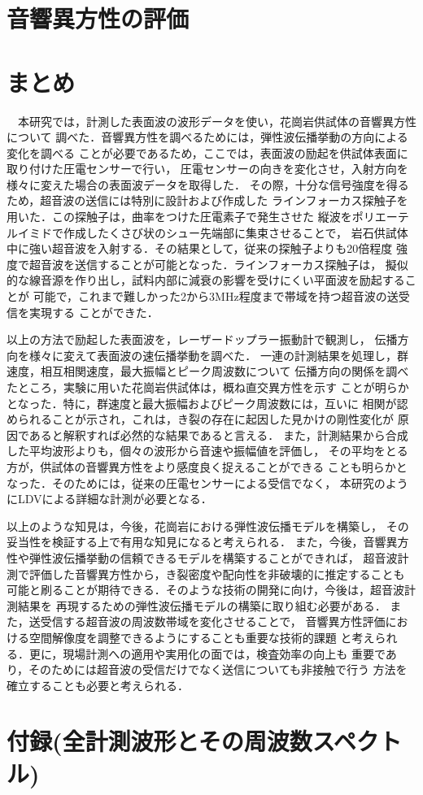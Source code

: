 ﻿\documentclass[11pt,a4j]{jarticle}
\begin{document}
\section{音響異方性の評価}

\newpage
\section{まとめ}
　本研究では，計測した表面波の波形データを使い，花崗岩供試体の音響異方性について
調べた．音響異方性を調べるためには，弾性波伝播挙動の方向による変化を調べる
ことが必要であるため，ここでは，表面波の励起を供試体表面に取り付けた圧電センサーで行い，
圧電センサーの向きを変化させ，入射方向を様々に変えた場合の表面波データを取得した．
その際，十分な信号強度を得るため，超音波の送信には特別に設計および作成した
ラインフォーカス探触子を用いた．この探触子は，曲率をつけた圧電素子で発生させた
縦波をポリエーテルイミドで作成したくさび状のシュー先端部に集束させることで，
岩石供試体中に強い超音波を入射する．その結果として，従来の探触子よりも20倍程度
強度で超音波を送信することが可能となった．ラインフォーカス探触子は，
擬似的な線音源を作り出し，試料内部に減衰の影響を受けにくい平面波を励起することが
可能で，これまで難しかった2から3MHz程度まで帯域を持つ超音波の送受信を実現する
ことができた．

以上の方法で励起した表面波を，レーザードップラー振動計で観測し，
伝播方向を様々に変えて表面波の速伝播挙動を調べた．
一連の計測結果を処理し，群速度，相互相関速度，最大振幅とピーク周波数について
伝播方向の関係を調べたところ，実験に用いた花崗岩供試体は，概ね直交異方性を示す
ことが明らかとなった．特に，群速度と最大振幅およびピーク周波数には，互いに
相関が認められることが示され，これは，き裂の存在に起因した見かけの剛性変化が
原因であると解釈すれば必然的な結果であると言える．
また，計測結果から合成した平均波形よりも，個々の波形から音速や振幅値を評価し，
その平均をとる方が，供試体の音響異方性をより感度良く捉えることができる
ことも明らかとなった．そのためには，従来の圧電センサーによる受信でなく，
本研究のようにLDVによる詳細な計測が必要となる．

以上のような知見は，今後，花崗岩における弾性波伝播モデルを構築し，
その妥当性を検証する上で有用な知見になると考えられる．
また，今後，音響異方性や弾性波伝播挙動の信頼できるモデルを構築することができれば，
超音波計測で評価した音響異方性から，き裂密度や配向性を非破壊的に推定することも
可能と刷ることが期待できる．そのような技術の開発に向け，今後は，超音波計測結果を
再現するための弾性波伝播モデルの構築に取り組む必要がある．
また，送受信する超音波の周波数帯域を変化させることで，
音響異方性評価における空間解像度を調整できるようにすることも重要な技術的課題
と考えられる．更に，現場計測への適用や実用化の面では，検査効率の向上も
重要であり，そのためには超音波の受信だけでなく送信についても非接触で行う
方法を確立することも必要と考えられる．
\section{付録(全計測波形とその周波数スペクトル)}

\end{document}
